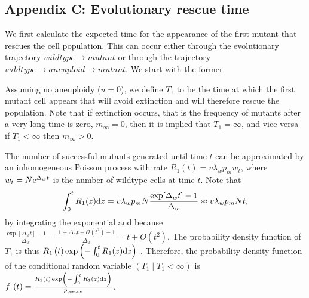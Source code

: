 \documentclass[12pt]{extarticle}
\renewcommand{\d}[1]{\ensuremath{\operatorname{d}\!{#1}}}
\renewcommand{\d}{{\rm d}}
\newcommand{\e}{{\rm e}}
\newcommand{\presc}{p_\text{rescue}}
\begin{document}
\begin{appendices}
\section*{Appendix C: Evolutionary rescue time}

We first calculate the expected time for the appearance of the first mutant that rescues the cell population.
This can occur either through the evolutionary trajectory $wildtype \rightarrow mutant$ or through the trajectory $wildtype \rightarrow aneuploid \rightarrow mutant$.
We start with the former. 

Assuming no aneuploidy ($u=0$), we define $T_1$ to be the time at which the first mutant cell appears that will avoid extinction and will therefore rescue the population.
Note that if extinction occurs, that is the frequency of mutants after a very long time is zero, $m_{\infty}=0$, then it is implied that $T_1=\infty$, and vice versa if $T_1<\infty$ then $m_{\infty}>0$.

The number of successful mutants generated until time $t$ can be approximated by an inhomogeneous Poisson process with rate $R_1\left(t\right) = v\lambda_w p_m w_t$,
where $w_t=N\e^{\Delta_w t}$ is the number of wildtype cells at time $t$.
Note that 
\begin{equation}\label{eq:integralR}
\int_0^{t}{R_1(z)\d z} = 
v\lambda_w p_m N \frac{\exp[{\Delta_w t}]-1}{\Delta_w} \approx 
v\lambda_w p_m N t,
\end{equation}
by integrating the exponential and because $\frac{\exp[\Delta_w t]-1}{\Delta_w}=\frac{1+\Delta_w t+\mathcal{O}(t^2)-1}{\Delta_w}=t+O(t^2)$.
The probability density function of $T_1$ is thus
$R_1\left(t\right)\exp\left(-\int_0^{t}{R_1(z)\d z}\right)$ \citep{allen2010introduction}. %
Therefore, the probability density function of the conditional random variable $(T_1 \mid T_1 < \infty)$ is
$f_1(t) = \frac{R_1\left(t\right)\exp\left(-\int_0^{t}{R_1(z)\d z}\right)}{\presc}$. 
\\


\end{appendices}
\end{document}
